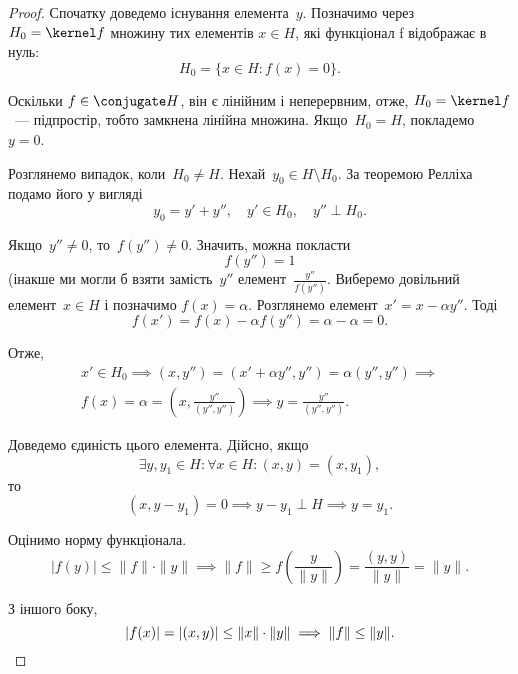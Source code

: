 \begin{proof}
Спочатку доведемо існування елемента~$y$.
Позначимо через~$H_0 = \kernel f$ множину тих елементів
$x \in H$, які функціонал f відображає в нуль:
\begin{equation*}
    H_0 = \{x \in H: f(x) = 0\}.
\end{equation*}

Оскільки
$f \in \conjugate H$, він є лінійним і неперервним, отже,
$H_0 = \kernel f$~--- підпростір, тобто замкнена лінійна
множина. Якщо~$H_0 = H$, покладемо~$y = 0$.

Розглянемо випадок, коли~$H_0 \ne H$. Нехай~$y_0 \in H \setminus H_0$.
За теоремою Релліха подамо його у вигляді
\begin{equation*}
    y_0 = y' + y'', \quad y' \in H_0, \quad y'' \perp H_0.
\end{equation*}

Якщо~$y'' \ne 0$, то~$f(y'') \ne 0$. Значить, можна покласти
\begin{equation*}
    f(y'') = 1
\end{equation*}
(інакше ми могли б взяти замість~$y''$ елемент~$\frac{y''}{f(y'')}$.
Виберемо довільний елемент~$x \in H$ і позначимо
$f(x) = \alpha$. Розглянемо елемент~$x' = x - \alpha y''$. Тоді
\begin{equation*}
    f(x') = f(x) - \alpha f(y'') = \alpha - \alpha = 0.    
\end{equation*}

Отже,
\begin{multline*}
    x' \in H_0 \implies (x, y'') = (x' + \alpha y'', y'') = \alpha (y'', y'') \implies \\
    f(x) = \alpha = \left( x, \frac{y''}{(y'', y'')} \right) \implies y = \frac{y''}{(y'', y'')}.
\end{multline*}

Доведемо єдиність цього елемента. Дійсно, якщо
\begin{equation*}
    \exists y, y_1 \in H: \forall x \in H: (x, y) = (x, y_1),
\end{equation*}
то
\begin{equation*}
    (x, y - y_1) = 0 \implies y - y_1 \perp H \implies y = y_1.
\end{equation*}

Оцінимо норму функціонала.
\begin{equation*}
    |f(y)| \le \|f\| \cdot \|y\| \implies
    \|f\| \ge f \left( \frac{y}{\|y\|} \right) = \frac{(y, y)}{\|y\|} = \|y\|.
\end{equation*}

З іншого боку,
\begin{equation*}
    |f(x)| = |(x, y)| \le \|x\| \cdot \|y\| \implies
    \|f\| \le \|y\|. \qedhere
\end{equation*}
\end{proof}

